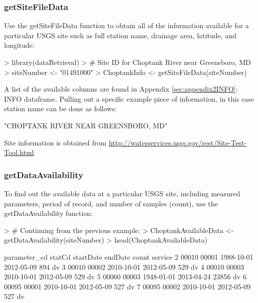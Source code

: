 \documentclass[a4paper,11pt]{article}
\begin{document}
\subsubsection{getSiteFileData}
\label{sec:usgsSiteFileData}
Use the getSiteFileData function to obtain all of the information available for a particular USGS site such as full station name, drainage area, latitude, and longitude:


\begin{Schunk}
\begin{Sinput}
> library(dataRetrieval)
> # Site ID for Choptank River near Greensboro, MD
> siteNumber <- "01491000" 
> ChoptankInfo <- getSiteFileData(siteNumber)
\end{Sinput}
\end{Schunk}

A list of the available columns are found in Appendix \ref{sec:appendix2INFO}: INFO dataframe. Pulling out a specific example piece of information, in this case station name can be done as follows:

\begin{Schunk}
\begin{Soutput}
[1] "CHOPTANK RIVER NEAR GREENSBORO, MD"
\end{Soutput}
\end{Schunk}
Site information is obtained from \url{http://waterservices.usgs.gov/rest/Site-Test-Tool.html}
\FloatBarrier
\subsubsection{getDataAvailability}
\label{sec:usgsDataAvailability}
To find out the available data at a particular USGS site, including measured parameters, period of record, and number of samples (count), use the getDataAvailability function:

\begin{Schunk}
\begin{Sinput}
> # Continuing from the previous example:
> ChoptankAvailableData <- getDataAvailability(siteNumber)
> head(ChoptankAvailableData)
\end{Sinput}
\begin{Soutput}
  parameter_cd statCd  startDate    endDate count service
2        00010  00001 1988-10-01 2012-05-09   894      dv
3        00010  00002 2010-10-01 2012-05-09   529      dv
4        00010  00003 2010-10-01 2012-05-09   529      dv
5        00060  00003 1948-01-01 2013-04-24 23856      dv
6        00095  00001 2010-10-01 2012-05-09   527      dv
7        00095  00002 2010-10-01 2012-05-09   527      dv
\end{Soutput}
\end{Schunk}
\end{document}
